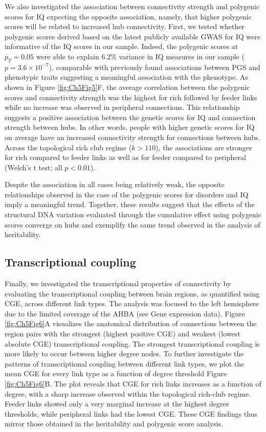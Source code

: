 We also investigated the association between connectivity strength and polygenic scores for IQ expecting the opposite association, namely, that higher polygenic scores will be related to increased hub connectivity. First, we tested whether polygenic scores derived based on the latest publicly available GWAS for IQ \citep{Savage2018} were informative of the IQ scores in our sample. Indeed, the polygenic scores at $p_{T} = 0.05$ were able to explain $6.2\%$ variance in IQ measures in our sample ($p = 3.6 \times 10^{-7}$), comparable with previously found associations between PGS and phenotypic traits \citep{Euesden2015} suggesting a meaningful association with the phenotype. As shown in Figure \ref{fig:Ch5Fig5}F, the average correlation between the polygenic scores and connectivity strength was the highest for rich followed by feeder links while no increase was observed in peripheral connections. This relationship suggests a positive association between the genetic scores for IQ and connection strength between hubs. In other words, people with higher genetic scores for IQ on average have an increased connectivity strength for connections between hubs. Across the topological rich club regime ($k > 110$), the associations are stronger for rich compared to feeder links as well as for feeder compared to peripheral (Welch's t test; all $p<0.01$).


Despite the association in all cases being relatively weak, the opposite relationships observed in the case of the polygenic scores for disorders and IQ imply a meaningful trend. Together, these results suggest that the effects of the structural DNA variation evaluated through the cumulative effect using polygenic scores converge on hubs and exemplify the same trend observed in the analysis of heritability.

\subsection{Transcriptional coupling}

Finally, we investigated the transcriptional properties of connectivity by evaluating the transcriptional coupling between brain regions, as quantified using CGE, across different link types. The analysis was focused to the left hemisphere due to the limited coverage of the AHBA (see Gene expression data). Figure \ref{fig:Ch5Fig6}A visualizes the anatomical distribution of connections between the region pairs with the strongest (highest positive CGE) and weakest (lowest absolute CGE) transcriptional coupling. The strongest transcriptional coupling is more likely to occur between higher degree nodes. To further investigate the patterns of transcriptional coupling between different link types, we plot the mean CGE for every link type as a function of degree threshold Figure \ref{fig:Ch5Fig6}B. The plot reveals that CGE for rich links increases as a function of degree, with a sharp increase observed within the topological rich-club regime. Feeder links showed only a very marginal increase at the highest degree thresholds, while peripheral links had the lowest CGE. These CGE findings thus mirror those obtained in the heritability and polygenic score analysis.

